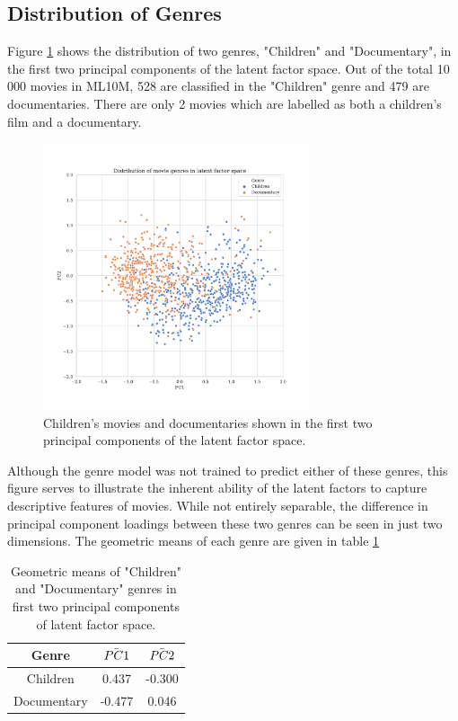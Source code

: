 \subsection{Distribution of Genres}
Figure \ref{fig:5-genre-pca} shows the distribution of two genres, "Children" and "Documentary", in the first two principal components of the latent factor space. Out of the total 10 000 movies in ML10M, 528 are classified in the "Children" genre and 479 are documentaries. There are only 2 movies which are labelled as both a children's film and a documentary.

\begin{figure}[H]
\centering
\includegraphics[width=0.7\textwidth]{Figures/5_ml10m-genre-pca.pdf}
\decoRule
\caption[Distribution of genres in latent factor space]{Children's movies and documentaries shown in the first two principal components of the latent factor space.}
\label{fig:5-genre-pca}
\end{figure}

Although the genre model was not trained to predict either of these genres, this figure serves to illustrate the inherent ability of the latent factors to capture descriptive features of movies. While not entirely separable, the difference in principal component loadings between these two genres can be seen in just two dimensions. The geometric means of each genre are given in table \ref{tab:ml10m-genre-pca}

\begin{table}[H]
\centering
\begin{tabular}{c | c | c}
\toprule
\textbf{Genre} & \textbf{$\Bar{PC1}$} & \textbf{$\Bar{PC2}$} \\
\midrule
Children & 0.437 & -0.300 \\
\midrule
Documentary & -0.477 & 0.046 \\
\bottomrule
\end{tabular}
\caption[Genre principal component means]{Geometric means of "Children" and "Documentary" genres in first two principal components of latent factor space.}
\label{tab:ml10m-genre-pca}
\end{table}

